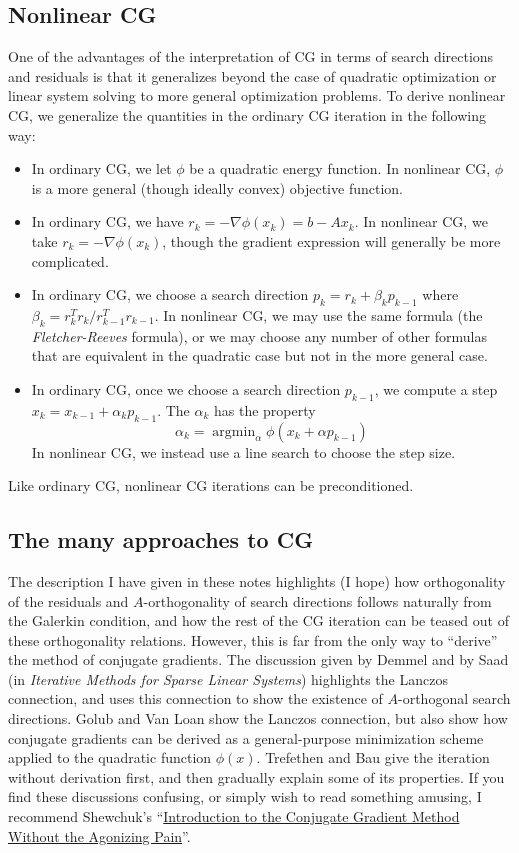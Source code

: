 \documentclass[12pt, leqno]{article} %
\begin{document}
\subsection{Nonlinear CG}

One of the advantages of the interpretation of CG in terms of search
directions and residuals is that it generalizes beyond the case of
quadratic optimization or linear system solving to more general
optimization problems.  To derive nonlinear CG, we generalize the
quantities in the ordinary CG iteration in the following way:
\begin{itemize}
\item
  In ordinary CG, we let $\phi$ be a quadratic energy function.
  In nonlinear CG, $\phi$ is a more general (though ideally
  convex) objective function.
\item
  In ordinary CG, we have $r_k = -\nabla \phi(x_k) = b-Ax_k$.
  In nonlinear CG, we take $r_k = -\nabla \phi(x_k)$, though the
  gradient expression will generally be more complicated.
\item
  In ordinary CG, we choose a search direction $p_k = r_k + \beta_k p_{k-1}$
  where $\beta_k = r_k^T r_k / r_{k-1}^T r_{k-1}$.  In nonlinear CG,
  we may use the same formula (the {\em Fletcher-Reeves} formula),
  or we may choose any number of other formulas that are equivalent
  in the quadratic case but not in the more general case.
\item
  In ordinary CG, once we choose a search direction $p_{k-1}$, we compute
  a step $x_k = x_{k-1} + \alpha_{k} p_{k-1}$.  The $\alpha_k$ has
  the property
  \[
    \alpha_k = \operatorname{argmin}_{\alpha} \phi(x_k + \alpha p_{k-1})
  \]
  In nonlinear CG, we instead use a line search to choose the step size.
\end{itemize}
Like ordinary CG, nonlinear CG iterations can be preconditioned.

\subsection{The many approaches to CG}

The description I have given in these notes highlights (I hope)
how orthogonality of the residuals and $A$-orthogonality
of search directions follows naturally from the Galerkin condition,
and how the rest of the CG iteration can be teased out of these
orthogonality relations.  However, this is far from the only way
to ``derive'' the method of conjugate gradients.  The discussion
given by Demmel and by Saad
(in {\em Iterative Methods for Sparse Linear Systems})
highlights the Lanczos connection, and uses this connection to
show the existence of $A$-orthogonal search directions.
Golub and Van Loan show the Lanczos connection, but also show
how conjugate gradients can be derived as a general-purpose minimization
scheme applied to the quadratic function $\phi(x)$.  Trefethen and Bau
give the iteration without derivation first, and then gradually explain
some of its properties.  If you find these discussions confusing,
or simply wish to read something amusing, I recommend Shewchuk's
``\href{http://www.cs.cmu.edu/~quake-papers/painless-conjugate-gradient.pdf}{Introduction to the Conjugate Gradient Method Without the Agonizing Pain}''.
\end{document}
